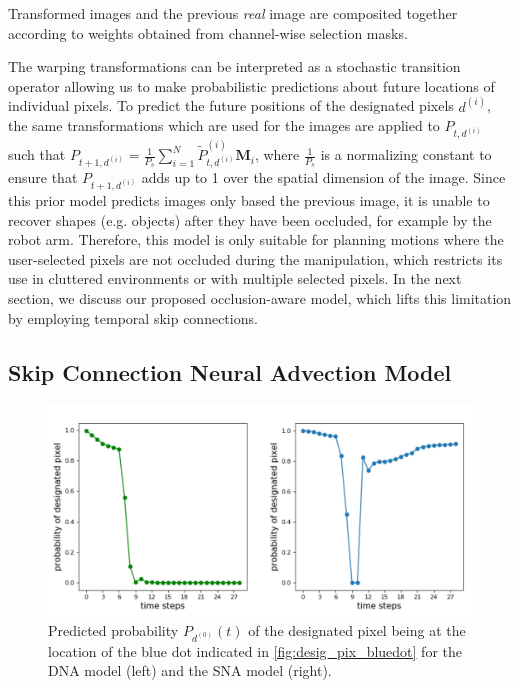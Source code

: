  Transformed images and the previous \emph{real} image are composited together according to weights obtained from channel-wise selection masks.
 
The warping transformations can be interpreted as a stochastic transition operator allowing us to make probabilistic predictions about future locations of individual pixels. To predict the future positions of the designated pixels $d^{(i)}$, the same transformations which are used for the images are applied to $P_{t,d^{(i)}}$ such that $P_{t+1,d^{(i)}} = \frac{1}{P_s}\sum_{i=1}^N \tilde P^{(i)}_{t,d^{(i)}} \mathbf{M}_i $, where $\frac{1}{P_s}$ is a normalizing constant to ensure that $P_{t+1,d^{(i)}}$ adds up to 1 over the spatial dimension of the image. Since this prior model predicts images only based the previous image, it is unable to recover shapes (e.g. objects) after they have been occluded, for example by the robot arm. Therefore, this model is only suitable for planning motions where the user-selected pixels are not occluded during the manipulation, which restricts its use in cluttered environments or with multiple selected pixels. In the next section, we discuss our proposed occlusion-aware model, which lifts this limitation by employing temporal skip connections.

\subsection{Skip Connection Neural Advection Model}

\begin{figure}[t]
        \centering
        \includegraphics[width=0.9\columnwidth]{images_sna/occlusionaware/probability_curves.pdf}
        \caption{Predicted probability $P_{d^{(0)}}(t)$ of the designated pixel being at the location of the blue dot indicated in \autoref{fig:desig_pix_bluedot} for the DNA model (left) and the SNA model (right).}        \label{fig:pix_reqppear_graph}
\end{figure}


